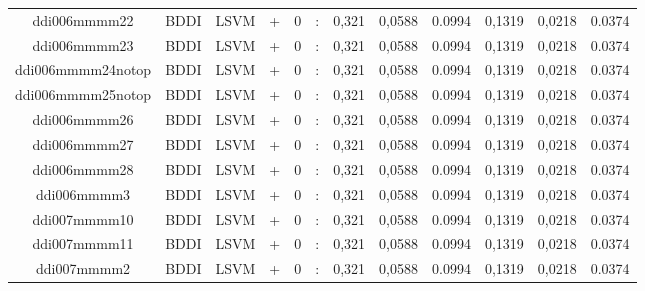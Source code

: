 \documentclass[a4paper]{article}
\begin{document}
\begin{landscape}
\begin{center}
\begin{tabular}{ |c|c|c|c|c|c|c|c|c|c|c|c|}
 
 	
 	\small{ ddi006mmmm22 } & BDDI & LSVM & +  &  0 &  :  &  0,321 & 0,0588 & 0.0994  &  0,1319 & 0,0218 & 0.0374 \\
 	

 
 	
 	\small{ ddi006mmmm23 } & BDDI & LSVM & +  &  0 &  :  &  0,321 & 0,0588 & 0.0994  &  0,1319 & 0,0218 & 0.0374 \\
 	

 
 	
 	\small{ ddi006mmmm24notop } & BDDI & LSVM & +  &  0 &  :  &  0,321 & 0,0588 & 0.0994  &  0,1319 & 0,0218 & 0.0374 \\
 	

 
 	
 	\small{ ddi006mmmm25notop } & BDDI & LSVM & +  &  0 &  :  &  0,321 & 0,0588 & 0.0994  &  0,1319 & 0,0218 & 0.0374 \\
 	

 
 	
 	\small{ ddi006mmmm26 } & BDDI & LSVM & +  &  0 &  :  &  0,321 & 0,0588 & 0.0994  &  0,1319 & 0,0218 & 0.0374 \\
 	

 
 	
 	\small{ ddi006mmmm27 } & BDDI & LSVM & +  &  0 &  :  &  0,321 & 0,0588 & 0.0994  &  0,1319 & 0,0218 & 0.0374 \\
 	

 
 	
 	\small{ ddi006mmmm28 } & BDDI & LSVM & +  &  0 &  :  &  0,321 & 0,0588 & 0.0994  &  0,1319 & 0,0218 & 0.0374 \\
 	

 
 	
 	\small{ ddi006mmmm3 } & BDDI & LSVM & +  &  0 &  :  &  0,321 & 0,0588 & 0.0994  &  0,1319 & 0,0218 & 0.0374 \\
 	

 
 	
 	\small{ ddi007mmmm10 } & BDDI & LSVM & +  &  0 &  :  &  0,321 & 0,0588 & 0.0994  &  0,1319 & 0,0218 & 0.0374 \\
 	

 
 	
 	\small{ ddi007mmmm11 } & BDDI & LSVM & +  &  0 &  :  &  0,321 & 0,0588 & 0.0994  &  0,1319 & 0,0218 & 0.0374 \\
 	

 
 	
 	\small{ ddi007mmmm2 } & BDDI & LSVM & +  &  0 &  :  &  0,321 & 0,0588 & 0.0994  &  0,1319 & 0,0218 & 0.0374 \\
 	


\end{tabular}
\end{center}
\end{landscape}
\end{document}
